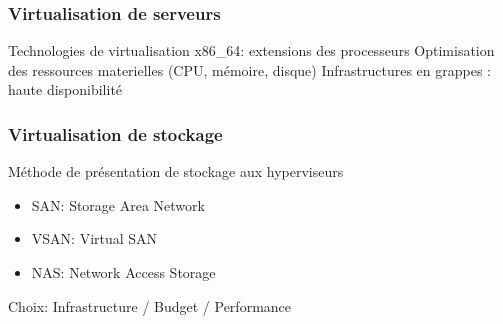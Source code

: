 \documentclass{beamer}
\begin{document}

\begin{frame}
\frametitle{Virtualisation de serveurs}

Technologies de virtualisation x86\_64: extensions des processeurs
\medbreak
\medbreak
Optimisation des ressources materielles (CPU, mémoire, disque)
\medbreak
\medbreak
Infrastructures en grappes : haute disponibilité %

\end{frame}


\begin{frame}
\frametitle{Virtualisation de stockage}

Méthode de présentation de stockage aux hyperviseurs

\begin{itemize}
    \item SAN: Storage Area Network
    \item VSAN: Virtual SAN
    \item NAS: Network Access Storage
\end{itemize}

Choix: Infrastructure / Budget / Performance









\end{frame}

\end{document}

